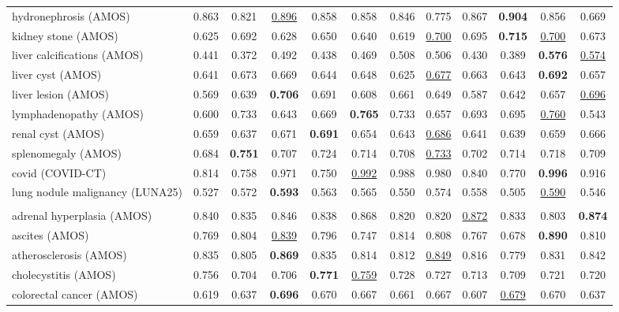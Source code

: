 \begin{minipage}{\textwidth}
{\begin{tabular}{@{}lccccccccccc@{}}
hydronephrosis (AMOS) & 0.863 & 0.821 & \underline{0.896} & 0.858 & 0.858 & 0.846 & 0.775 & 0.867 & \textbf{0.904} & 0.856 & 0.669 \\
kidney stone (AMOS) & 0.625 & 0.692 & 0.628 & 0.650 & 0.640 & 0.619 & \underline{0.700} & 0.695 & \textbf{0.715} & \underline{0.700} & 0.673 \\
liver calcifications (AMOS) & 0.441 & 0.372 & 0.492 & 0.438 & 0.469 & 0.508 & 0.506 & 0.430 & 0.389 & \textbf{0.576} & \underline{0.574} \\
liver cyst (AMOS) & 0.641 & 0.673 & 0.669 & 0.644 & 0.648 & 0.625 & \underline{0.677} & 0.663 & 0.643 & \textbf{0.692} & 0.657 \\
liver lesion (AMOS) & 0.569 & 0.639 & \textbf{0.706} & 0.691 & 0.608 & 0.661 & 0.649 & 0.587 & 0.642 & 0.657 & \underline{0.696} \\
lymphadenopathy (AMOS) & 0.600 & 0.733 & 0.643 & 0.669 & \textbf{0.765} & 0.733 & 0.657 & 0.693 & 0.695 & \underline{0.760} & 0.543 \\
renal cyst (AMOS) & 0.659 & 0.637 & 0.671 & \textbf{0.691} & 0.654 & 0.643 & \underline{0.686} & 0.641 & 0.639 & 0.659 & 0.666 \\
splenomegaly (AMOS) & 0.684 & \textbf{0.751} & 0.707 & 0.724 & 0.714 & 0.708 & \underline{0.733} & 0.702 & 0.714 & 0.718 & 0.709 \\
covid (COVID-CT) & 0.814 & 0.758 & 0.971 & 0.750 & \underline{0.992} & 0.988 & 0.980 & 0.840 & 0.770 & \textbf{0.996} & 0.916 \\
lung nodule malignancy (LUNA25) & 0.527 & 0.572 & \textbf{0.593} & 0.563 & 0.565 & 0.550 & 0.574 & 0.558 & 0.505 & \underline{0.590} & 0.546 \\
\addlinespace
\multicolumn{12}{@{}l}{\textit{joint}} \\
adrenal hyperplasia (AMOS) & 0.840 & 0.835 & 0.846 & 0.838 & 0.868 & 0.820 & 0.820 & \underline{0.872} & 0.833 & 0.803 & \textbf{0.874} \\
ascites (AMOS) & 0.769 & 0.804 & \underline{0.839} & 0.796 & 0.747 & 0.814 & 0.808 & 0.767 & 0.678 & \textbf{0.890} & 0.810 \\
atherosclerosis (AMOS) & 0.835 & 0.805 & \textbf{0.869} & 0.835 & 0.814 & 0.812 & \underline{0.849} & 0.816 & 0.779 & 0.831 & 0.842 \\
cholecystitis (AMOS) & 0.756 & 0.704 & 0.706 & \textbf{0.771} & \underline{0.759} & 0.728 & 0.727 & 0.713 & 0.709 & 0.721 & 0.720 \\
colorectal cancer (AMOS) & 0.619 & 0.637 & \textbf{0.696} & 0.670 & 0.667 & 0.661 & 0.667 & 0.607 & \underline{0.679} & 0.670 & 0.637 \\

\end{tabular}}
\end{minipage}
